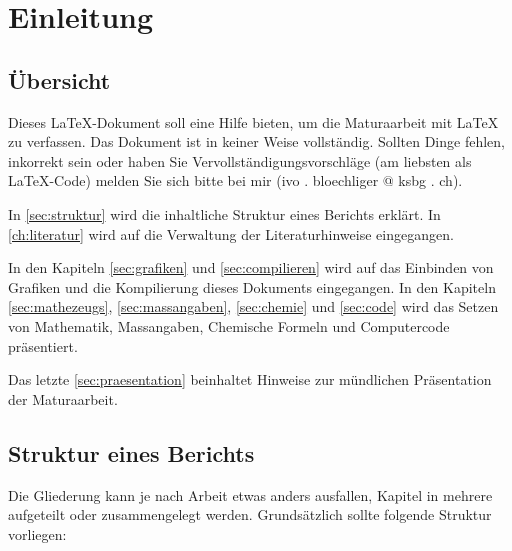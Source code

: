 \chapter{Einleitung}\label{sec:einleitung}
\section{Übersicht}
Dieses \LaTeX-Dokument soll eine Hilfe bieten, um die Maturaarbeit mit
\LaTeX{} zu verfassen. Das Dokument ist in keiner Weise
vollständig. Sollten Dinge fehlen, inkorrekt sein 
oder haben Sie Vervollständigungsvorschläge (am liebsten als \LaTeX-Code)
melden Sie sich
bitte bei mir (ivo . bloechliger @ ksbg . ch).

In \autoref{sec:struktur} wird die inhaltliche Struktur eines Berichts
erklärt. In \autoref{ch:literatur} wird auf die Verwaltung der
Literaturhinweise eingegangen. 

In den Kapiteln \ref{sec:grafiken} und \ref{sec:compilieren} wird auf das
Einbinden von Grafiken und die Kompilierung dieses Dokuments eingegangen.
In den Kapiteln \ref{sec:mathezeugs}, \ref{sec:massangaben}, \ref{sec:chemie}
und \ref{sec:code} wird das Setzen von Mathematik, Massangaben, Chemische
Formeln und Computercode präsentiert.

Das letzte \autoref{sec:praesentation} beinhaltet Hinweise zur mündlichen
Präsentation der Maturaarbeit.

\section{Struktur eines Berichts}\label{sec:struktur}

Die Gliederung kann je nach Arbeit etwas anders ausfallen, Kapitel in
mehrere aufgeteilt oder zusammengelegt werden. Grundsätzlich sollte
folgende Struktur vorliegen:

